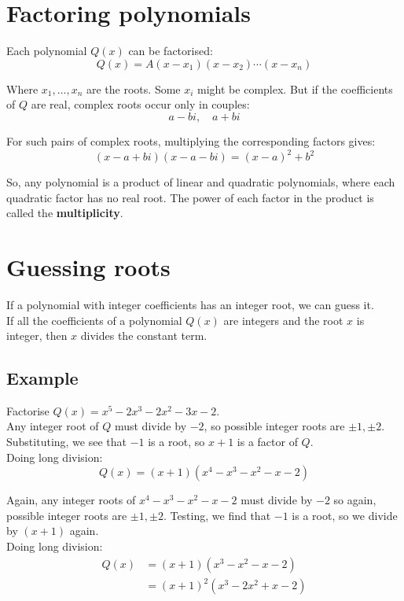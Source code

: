 \documentclass[11pt]{article}
\begin{document}
\section{Factoring polynomials}
\label{sec:orgced3360}
Each polynomial \(Q(x)\) can be factorised:
\[Q(x) = A(x - x_1)(x - x_2) \cdots (x - x_n)\]

Where \(x_1, \ldots, x_n\) are the roots. Some \(x_i\) might be complex. But if the coefficients of \(Q\) are real, complex roots occur only in couples:
\[a - bi, \quad a + bi\]

For such pairs of complex roots, multiplying the corresponding factors gives:
\[(x - a + bi)(x - a - bi) = (x - a)^2 + b^2\]

So, any polynomial is a product of linear and quadratic polynomials, where each quadratic factor has no real root. The power of each factor in the product is called the \textbf{multiplicity}.


\section{Guessing roots}
\label{sec:orgdc179eb}
If a polynomial with integer coefficients has an integer root, we can guess it.
\\[0pt]

If all the coefficients of a polynomial \(Q(x)\) are integers and the root \(x\) is integer, then \(x\) divides the constant term.

\subsection{Example}
\label{sec:org9fe3c1a}
Factorise \(Q(x) = x^5 - 2x^3 - 2x^2 - 3x - 2\).
\\[0pt]

Any integer root of \(Q\) must divide by \(-2\), so possible integer roots are \(\pm 1, \pm 2\). Substituting, we see that \(-1\) is a root, so \(x + 1\) is a factor of \(Q\).
\\[0pt]

Doing long division:
\[Q(x) = (x + 1)(x^4 - x^3 - x^2 - x - 2)\]

Again, any integer roots of \(x^4 - x^3 - x^2 - x - 2\) must divide by \(-2\) so again, possible integer roots are \(\pm 1, \pm 2\). Testing, we find that \(-1\) is a root, so we divide by \((x + 1)\) again.
\\[0pt]

Doing long division:
\begin{align*}
Q(x) &= (x + 1)(x^3 - x^2 - x - 2) \\
&= (x + 1)^2 (x^3 - 2x^2 + x - 2)
\end{align*}
\end{document}
